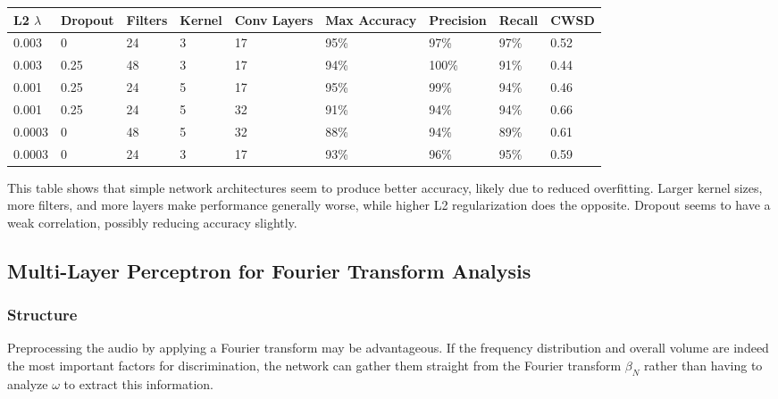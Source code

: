 \documentclass[10pt]{article}
\begin{document}
\begin{minipage}{\textwidth}
    \begin{center}
        \begin{tabular}{|l|l|l|l|l|l|l|l|l|}
            \hline
            L2 $\lambda$ & Dropout & Filters & Kernel & Conv Layers & Max Accuracy & Precision & Recall & CWSD \\
            \hline
            0.003 & 0 & 24 & 3 & 17 & 95\% & 97\% & 97\% & 0.52 \\
            \hline
            0.003 & 0.25 & 48 & 3 & 17 & 94\% & 100\% & 91\% & 0.44 \\
            \hline
            0.001 & 0.25 & 24 & 5 & 17 & 95\% & 99\% & 94\% & 0.46 \\
            \hline
            0.001 & 0.25 & 24 & 5 & 32 & 91\% & 94\% & 94\% & 0.66 \\
            \hline
            0.0003 & 0 & 48 & 5 & 32 & 88\% & 94\% & 89\% & 0.61 \\
            \hline
            0.0003 & 0 & 24 & 3 & 17 & 93\% & 96\% & 95\% & 0.59 \\
            \hline
        \end{tabular}
    \end{center}
\end{minipage}

This table shows that simple network architectures seem to produce better accuracy, likely due to reduced overfitting. Larger kernel sizes, more filters, and more layers make performance generally worse, while higher L2 regularization does the opposite. Dropout seems to have a weak correlation, possibly reducing accuracy slightly.

\subsection{Multi-Layer Perceptron for Fourier Transform Analysis}

\subsubsection{Structure}

Preprocessing the audio by applying a Fourier transform may be advantageous. If the frequency distribution and overall volume are indeed the most important factors for discrimination, the network can gather them straight from the Fourier transform $\beta_{N}$ rather than having to analyze $\omega$ to extract this information.
\end{document}
